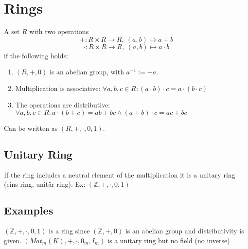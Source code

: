 \section{Rings}
\begin{definition}[Ring]
   A set \(R\) with two operations
   \[+: R \times R \to R,~(a, b) \mapsto a + b\]
   \[\cdot: R \times R \to R,~(a, b) \mapsto a \cdot b\]
   if the following holds:
   \begin{enumerate}[label=(\roman*)]
      \item \((R, +, 0)\) is an abelian group, with \(a^{-1} := -a\).
      \item Multiplication is associative: \(\forall a, b, c \in R: (a \cdot b) \cdot c = a \cdot (b \cdot c)\)
      \item The operations are distributive: \(\forall a, b, c \in R: a \cdot (b + c) = ab + bc \land (a + b) \cdot c = ac + bc\)
   \end{enumerate}
   Can be written as \((R, +, \cdot, 0, 1)\).
\end{definition}

\subsection{Unitary Ring}
If the ring includes a neutral element of the multiplication it is a unitary ring (eins-ring, unitär ring).
Ex: \((\mathbb{Z}, +, \cdot, 0, 1)\)

\subsection{Examples}
\((\mathbb{Z}, +, \cdot, 0, 1)\) is a ring since \((\mathbb{Z}, +, 0)\) is an abelian group and distributivity is given.
\((Mat_{m}(K), +, \cdot, 0_m, I_m)\) is a unitary ring but no field (no inverse)
